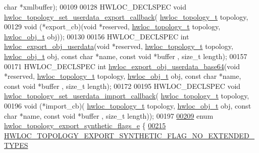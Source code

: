 \begin{DoxyCode}
{      char} *xmlbuffer);
00109 
00128 HWLOC\_DECLSPEC \textcolor{keywordtype}{void} \hyperlink{a00206_ga9d6ff0f7a8dd45be9aa8575ef31978cc}{hwloc\_topology\_set\_userdata\_export\_callback}(
      \hyperlink{a00186_ga9d1e76ee15a7dee158b786c30b6a6e38}{hwloc\_topology\_t} topology,
00129                                                                 \textcolor{keywordtype}{void} (*export\_cb)(\textcolor{keywordtype}{void} *reserved, 
      \hyperlink{a00186_ga9d1e76ee15a7dee158b786c30b6a6e38}{hwloc\_topology\_t} topology, \hyperlink{a00238}{hwloc\_obj\_t} obj));
00130 
00156 HWLOC\_DECLSPEC \textcolor{keywordtype}{int} \hyperlink{a00206_gaa541bdd628416dbbe97d0df69d3de958}{hwloc\_export\_obj\_userdata}(\textcolor{keywordtype}{void} *reserved, 
      \hyperlink{a00186_ga9d1e76ee15a7dee158b786c30b6a6e38}{hwloc\_topology\_t} topology, \hyperlink{a00238}{hwloc\_obj\_t} obj, \textcolor{keyword}{const} \textcolor{keywordtype}{char} *name, \textcolor{keyword}{const} \textcolor{keywordtype}{void} *buffer
      , \textcolor{keywordtype}{size\_t} length);
00157 
00171 HWLOC\_DECLSPEC \textcolor{keywordtype}{int} \hyperlink{a00206_ga1b7358137cec27bd073f58a606ecbaba}{hwloc\_export\_obj\_userdata\_base64}(\textcolor{keywordtype}{void} *reserved, 
      \hyperlink{a00186_ga9d1e76ee15a7dee158b786c30b6a6e38}{hwloc\_topology\_t} topology, \hyperlink{a00238}{hwloc\_obj\_t} obj, \textcolor{keyword}{const} \textcolor{keywordtype}{char} *name, \textcolor{keyword}{const} \textcolor{keywordtype}{void} *buffer
      , \textcolor{keywordtype}{size\_t} length);
00172 
00195 HWLOC\_DECLSPEC \textcolor{keywordtype}{void} \hyperlink{a00206_ga5ac6917ea7289955fb1ffda4353af9b0}{hwloc\_topology\_set\_userdata\_import\_callback}(
      \hyperlink{a00186_ga9d1e76ee15a7dee158b786c30b6a6e38}{hwloc\_topology\_t} topology,
00196                                                                 \textcolor{keywordtype}{void} (*import\_cb)(
      \hyperlink{a00186_ga9d1e76ee15a7dee158b786c30b6a6e38}{hwloc\_topology\_t} topology, \hyperlink{a00238}{hwloc\_obj\_t} obj, \textcolor{keyword}{const} \textcolor{keywordtype}{char} *name, \textcolor{keyword}{const} \textcolor{keywordtype}{void} *buffer
      , \textcolor{keywordtype}{size\_t} length));
00197 
\hyperlink{a00207_ga7ac6f97cc40bd50c40285084f869ba63}{00209} \textcolor{keyword}{enum} \hyperlink{a00207_ga7ac6f97cc40bd50c40285084f869ba63}{hwloc\_topology\_export\_synthetic\_flags\_e} \{
\hyperlink{a00207_gga7ac6f97cc40bd50c40285084f869ba63a3b3bd4ba2ef9990810865e561034ccc9}{00215}  \hyperlink{a00207_gga7ac6f97cc40bd50c40285084f869ba63a3b3bd4ba2ef9990810865e561034ccc9}{HWLOC\_TOPOLOGY\_EXPORT\_SYNTHETIC\_FLAG\_NO\_EXTENDED\_TYPES}

\end{DoxyCode}
